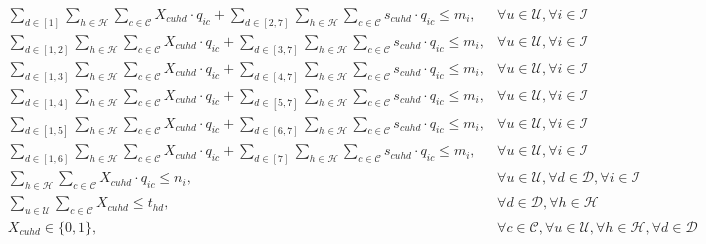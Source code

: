 \documentclass[11pt]{article}
\begin{document}
\begin{align}
&\sum\limits_{d\in[1]}\sum\limits_{h\in\mathcal{H}}\sum\limits_{c\in\mathcal{C}}X_{{c}{u}{h}{d}} \cdot q_{{i}{c}} + \sum\limits_{d\in[2,7]}\sum\limits_{h\in\mathcal{H}}\sum\limits_{c\in\mathcal{C}}s_{{c}{u}{h}{d}} \cdot q_{{i}{c}} \leq m_{i}, &\forall u \in \mathcal{U}, \forall i \in \mathcal{I} \label{mathmodel_weeklyquotalimit_rh1}&\\
&\sum\limits_{d\in[1,2]}\sum\limits_{h\in\mathcal{H}}\sum\limits_{c\in\mathcal{C}}X_{{c}{u}{h}{d}} \cdot q_{{i}{c}} + \sum\limits_{d\in[3,7]}\sum\limits_{h\in\mathcal{H}}\sum\limits_{c\in\mathcal{C}}s_{{c}{u}{h}{d}} \cdot q_{{i}{c}} \leq m_{i}, &\forall u \in \mathcal{U}, \forall i \in \mathcal{I} \label{mathmodel_weeklyquotalimit_rh2}&\\
&\sum\limits_{d\in[1,3]}\sum\limits_{h\in\mathcal{H}}\sum\limits_{c\in\mathcal{C}}X_{{c}{u}{h}{d}} \cdot q_{{i}{c}} + \sum\limits_{d\in[4,7]}\sum\limits_{h\in\mathcal{H}}\sum\limits_{c\in\mathcal{C}}s_{{c}{u}{h}{d}} \cdot q_{{i}{c}} \leq m_{i}, &\forall u \in \mathcal{U}, \forall i \in \mathcal{I} \label{mathmodel_weeklyquotalimit_rh3}&\\
&\sum\limits_{d\in[1,4]}\sum\limits_{h\in\mathcal{H}}\sum\limits_{c\in\mathcal{C}}X_{{c}{u}{h}{d}} \cdot q_{{i}{c}} + \sum\limits_{d\in[5,7]}\sum\limits_{h\in\mathcal{H}}\sum\limits_{c\in\mathcal{C}}s_{{c}{u}{h}{d}} \cdot q_{{i}{c}} \leq m_{i}, &\forall u \in \mathcal{U}, \forall i \in \mathcal{I} \label{mathmodel_weeklyquotalimit_rh4}&\\
&\sum\limits_{d\in[1,5]}\sum\limits_{h\in\mathcal{H}}\sum\limits_{c\in\mathcal{C}}X_{{c}{u}{h}{d}} \cdot q_{{i}{c}} + \sum\limits_{d\in[6,7]}\sum\limits_{h\in\mathcal{H}}\sum\limits_{c\in\mathcal{C}}s_{{c}{u}{h}{d}} \cdot q_{{i}{c}} \leq m_{i}, &\forall u \in \mathcal{U}, \forall i \in \mathcal{I} \label{mathmodel_weeklyquotalimit_rh5}&\\
&\sum\limits_{d\in[1,6]}\sum\limits_{h\in\mathcal{H}}\sum\limits_{c\in\mathcal{C}}X_{{c}{u}{h}{d}} \cdot q_{{i}{c}} + \sum\limits_{d\in[7]}\sum\limits_{h\in\mathcal{H}}\sum\limits_{c\in\mathcal{C}}s_{{c}{u}{h}{d}} \cdot q_{{i}{c}} \leq m_{i}, &\forall u \in \mathcal{U}, \forall i \in \mathcal{I} \label{mathmodel_weeklyquotalimit_rh6}&\\
&\sum\limits_{h\in\mathcal{H}}\sum\limits_{c\in\mathcal{C}}X_{{c}{u}{h}{d}} \cdot q_{{i}{c}} \leq n_{i}, &\forall u \in \mathcal{U}, \forall d \in \mathcal{D}, \forall i \in \mathcal{I} \label{mathmodel_dailyquotalimit}&\\
&\sum\limits_{u\in\mathcal{U}}\sum\limits_{c\in\mathcal{C}}X_{{c}{u}{h}{d}} \leq t_{{h}{d}}, &\forall d \in \mathcal{D}, \forall h \in \mathcal{H} \label{mathmodel_channellimit}&\\
&X_{{c}{u}{h}{d}} \in \{0,1\},&\forall c \in \mathcal{C}, \forall u \in \mathcal{U}, \forall h \in \mathcal{H}, \forall d \in \mathcal{D} \label{mathmodel_integrity}
\end{align}
\end{document}
